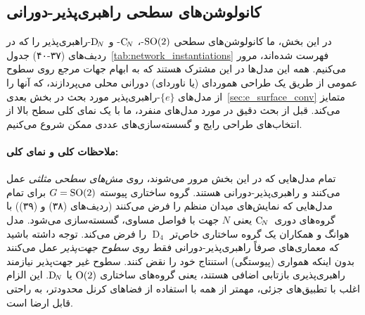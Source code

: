 

\subsection{کانولوشن‌های سطحی راهبری‌پذیر-دورانی}
\label{sec:so2_surface_conv}

در این بخش، ما کانولوشن‌های سطحی $\operatorname{SO}(2)$-، $\operatorname{C}_{\!N}$- و $\operatorname{D}_{\!N}$-راهبری‌پذیر را که در ردیف‌های (۳۷-۴۰) جدول~\ref{tab:network_instantiations} فهرست شده‌اند، مرور می‌کنیم.
همه این مدل‌ها در این مشترک هستند که به ابهام جهات مرجع روی سطوح عمومی از طریق یک طراحی هموردای (یا ناوردای) دورانی محلی می‌پردازند، که آنها را از مدل‌های $\{e\}$-راهبری‌پذیر مورد بحث در بخش بعدی~\ref{sec:e_surface_conv} متمایز می‌کند.
قبل از بحث دقیق در مورد مدل‌های منفرد، ما با یک نمای کلی سطح بالا از انتخاب‌های طراحی رایج و گسسته‌سازی‌های عددی ممکن شروع می‌کنیم.


\paragraph{ملاحظات کلی و نمای کلی:}
تمام مدل‌هایی که در این بخش مرور می‌شوند، روی \emph{مش‌های سطحی مثلثی} عمل می‌کنند و راهبری‌پذیر-دورانی هستند.
گروه ساختاری پیوسته $G=\operatorname{SO}(2)$ برای تمام مدل‌هایی که نمایش‌های میدان منظم را فرض می‌کنند (ردیف‌های (۳۸) و (۳۹)) با گروه‌های دوری~$\operatorname{C}_{\!N}$ یعنی $N$ جهت با فواصل مساوی، گسسته‌سازی می‌شود.
مدل هوانگ و همکاران\cite{huang2019texturenet} یک گروه ساختاری خاص‌تر $\operatorname{D}_4$ را فرض می‌کند.
توجه داشته باشید که معماری‌های صرفاً راهبری‌پذیر-دورانی فقط روی \emph{سطوح جهت‌پذیر} عمل می‌کنند بدون اینکه همواری (پیوستگی) استنتاج خود را نقض کنند.
سطوح غیر جهت‌پذیر نیازمند راهبری‌پذیری بازتابی اضافی هستند، یعنی گروه‌های ساختاری $\operatorname{O}(2)$ یا $\operatorname{D}_{\!N}$.
این الزام اغلب با تطبیق‌های جزئی، مهمتر از همه با استفاده از فضاهای کرنل محدودتر، به راحتی قابل ارضا است.


